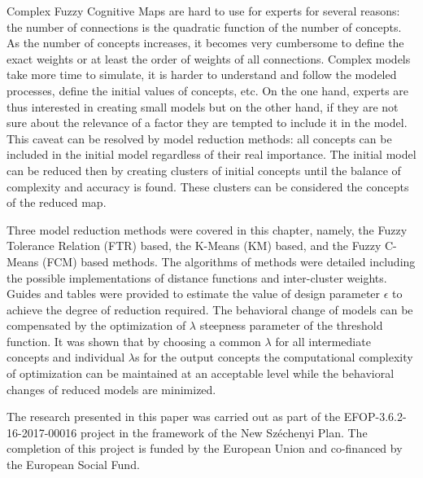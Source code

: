 \documentclass[graybox]{svmult}
\begin{document}
Complex Fuzzy Cognitive Maps are hard to use for experts for several reasons: the number of connections is the quadratic function of the number of concepts. As the number of concepts increases, it becomes very cumbersome to define the exact weights or at least the order of weights of all connections. Complex models take more time to simulate, it is harder to understand and follow the modeled processes, define the initial values of concepts, etc. On the one hand, experts are thus interested in creating small models but on the other hand, if they are not sure about the relevance of a factor they are tempted to include it in the model. This caveat can be resolved by model reduction methods: all concepts can be included in the initial model regardless of their real importance. The initial model can be reduced then by creating clusters of initial concepts until the balance of complexity and accuracy is found. These clusters can be considered the concepts of the reduced map.

Three model reduction methods were covered in this chapter, namely, the Fuzzy Tolerance Relation (FTR) based, the K-Means (KM) based, and the Fuzzy C-Means (FCM) based methods. The algorithms of methods were detailed including the possible implementations of distance functions and inter-cluster weights. Guides and tables were provided to estimate the value of design parameter $\epsilon$ to achieve the degree of reduction required. The behavioral change of models can be compensated by the optimization of $\lambda$ steepness parameter of the threshold function. It was shown that by choosing a common $\lambda$ for all intermediate concepts and individual $\lambda$s for the output concepts the computational complexity of optimization can be maintained at an acceptable level while the behavioral changes of reduced models are minimized.

\begin{acknowledgement}
The research presented in this paper was carried out as part of the EFOP-3.6.2-16-2017-00016 project in the framework of the New Széchenyi Plan. The completion of this project is funded by the European Union and co-financed by the European Social Fund.
\end{acknowledgement}


\end{document}
